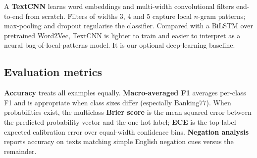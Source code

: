 A \textbf{TextCNN} learns word embeddings and multi-width convolutional filters end-to-end from scratch. Filters of widths 3, 4 and 5 capture local $n$-gram patterns; max-pooling and dropout regularise the classifier. Compared with a BiLSTM over pretrained Word2Vec, TextCNN is lighter to train and easier to interpret as a neural bag-of-local-patterns model. It is our optional deep-learning baseline.

\subsection{Evaluation metrics}

\textbf{Accuracy} treats all examples equally. \textbf{Macro-averaged F1} averages per-class F1 and is appropriate when class sizes differ (especially Banking77). When probabilities exist, the multiclass \textbf{Brier score} is the mean squared error between the predicted probability vector and the one-hot label; \textbf{ECE} is the top-label expected calibration error over equal-width confidence bins. \textbf{Negation analysis} reports accuracy on texts matching simple English negation cues versus the remainder.

